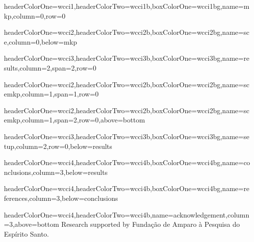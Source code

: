 \documentclass[landscape,final,a0paper,fontscale=0.38]{baposter}
\newenvironment{cframed}[1][white]
  {\begin{mdframed}[linewidth=0,backgroundcolor=#1] }
  {\end{mdframed}}
\newcommand{\myBoxEnv}[2]{\begin{cframed}[#1] #2 \end{cframed}}
\begin{document}
\begin{poster}
  {headerColorOne=wcci1,headerColorTwo=wcci1b,boxColorOne=wcci1bg,name=mkp,column=0,row=0}
  {\myBoxEnv{wcci1bg}{}}

  {headerColorOne=wcci2,headerColorTwo=wcci2b,boxColorOne=wcci2bg,name=sce,column=0,below=mkp}
  {\myBoxEnv{wcci2bg}{ }}

  {headerColorOne=wcci3,headerColorTwo=wcci3b,boxColorOne=wcci3bg,name=results,column=2,span=2,row=0}
  {\myBoxEnv{wcci3bg}{ }}

  {headerColorOne=wcci2,headerColorTwo=wcci2b,boxColorOne=wcci2bg,name=scemkp,column=1,span=1,row=0}
  {\myBoxEnv{wcci2bg}{}}

  {headerColorOne=wcci2,headerColorTwo=wcci2b,boxColorOne=wcci2bg,name=scemkp,column=1,span=2,row=0,above=bottom}
  {\myBoxEnv{wcci2bg}{ }}

  {headerColorOne=wcci3,headerColorTwo=wcci3b,boxColorOne=wcci3bg,name=setup,column=2,row=0,below=results} {\myBoxEnv{wcci3bg}{ }}

  {headerColorOne=wcci4,headerColorTwo=wcci4b,boxColorOne=wcci4bg,name=conclusions,column=3,below=results}
  {\myBoxEnv{wcci4bg}{  }}


  {headerColorOne=wcci4,headerColorTwo=wcci4b,boxColorOne=wcci4bg,name=references,column=3,below=conclusions}
  {\small   }

  {headerColorOne=wcci4,headerColorTwo=wcci4b,name=acknowledgement,column=3,above=bottom}
  {\fontsize{8pt}{0.5cm}\selectfont Research supported by Funda\c c\~ao de Amparo \`a Pesquisa do Esp\'irito Santo.  }

\end{poster}
\end{document}
